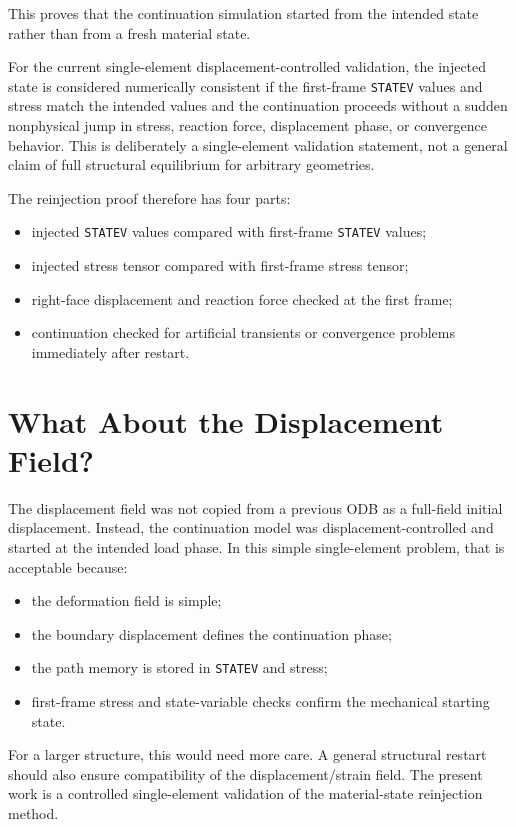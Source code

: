\documentclass[11pt,a4paper]{article}
\begin{document}
This proves that the continuation simulation started from the intended state rather than from a fresh material state.

For the current single-element displacement-controlled validation, the injected state is considered numerically consistent if the first-frame \texttt{STATEV} values and stress match the intended values and the continuation proceeds without a sudden nonphysical jump in stress, reaction force, displacement phase, or convergence behavior. This is deliberately a single-element validation statement, not a general claim of full structural equilibrium for arbitrary geometries.

The reinjection proof therefore has four parts:

\begin{itemize}
  \item injected \texttt{STATEV} values compared with first-frame \texttt{STATEV} values;
  \item injected stress tensor compared with first-frame stress tensor;
  \item right-face displacement and reaction force checked at the first frame;
  \item continuation checked for artificial transients or convergence problems immediately after restart.
\end{itemize}

\section{What About the Displacement Field?}

The displacement field was not copied from a previous ODB as a full-field initial displacement. Instead, the continuation model was displacement-controlled and started at the intended load phase. In this simple single-element problem, that is acceptable because:

\begin{itemize}
  \item the deformation field is simple;
  \item the boundary displacement defines the continuation phase;
  \item the path memory is stored in \texttt{STATEV} and stress;
  \item first-frame stress and state-variable checks confirm the mechanical starting state.
\end{itemize}

For a larger structure, this would need more care. A general structural restart should also ensure compatibility of the displacement/strain field. The present work is a controlled single-element validation of the material-state reinjection method.
\end{document}
